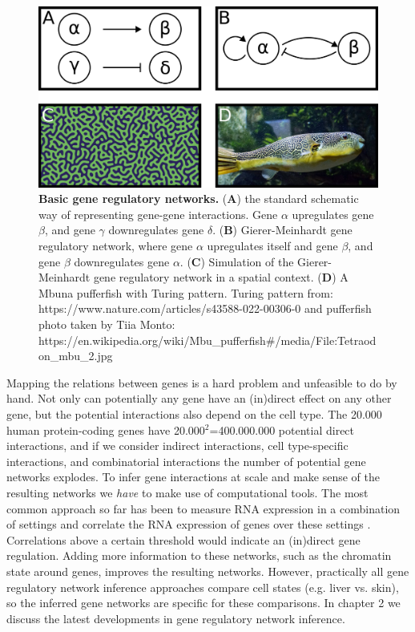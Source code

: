 \begin{figure}[H]
    \center
    \includegraphics[width=0.8\linewidth]{ch.introduction/imgs/network.png}
    \caption{\textbf{Basic gene regulatory networks.} (\textbf{A}) the standard schematic way of representing gene-gene interactions. Gene $\alpha$ upregulates gene $\beta$, and gene $\gamma$ downregulates gene $\delta$. (\textbf{B}) Gierer-Meinhardt gene regulatory network, where gene $\alpha$ upregulates itself and gene $\beta$, and gene $\beta$ downregulates gene $\alpha$. (\textbf{C}) Simulation of the Gierer-Meinhardt gene regulatory network in a spatial context. (\textbf{D}) A Mbuna pufferfish with Turing pattern. Turing pattern from: https://www.nature.com/articles/s43588-022-00306-0 and pufferfish photo taken by Tiia Monto: https://en.wikipedia.org/wiki/Mbu\_pufferfish\#/media/File:Tetraodon\_mbu\_2.jpg}
    \label{fig:network}
\end{figure}

Mapping the relations between genes is a hard problem and unfeasible to do by hand. Not only can potentially any gene have an (in)direct effect on any other gene, but the potential interactions also depend on the cell type. The 20.000 human protein-coding genes have 20.000$^2$=400.000.000 potential direct interactions, and if we consider indirect interactions, cell type-specific interactions, and combinatorial interactions the number of potential gene networks explodes. To infer gene interactions at scale and make sense of the resulting networks we \textit{have} to make use of computational tools. The most common approach so far has been to measure RNA expression in a combination of settings and correlate the RNA expression of genes over these settings \cite{Zhang_2005,Margolin_2006}. Correlations above a certain threshold would indicate an (in)direct gene regulation. Adding more information to these networks, such as the chromatin state around genes\cite{Xu_2020,Kamal_2021}, improves the resulting networks. However, practically all gene regulatory network inference approaches compare cell states (e.g. liver vs. skin), so the inferred gene networks are specific for these comparisons. In chapter 2 we discuss the latest developments in gene regulatory network inference.

